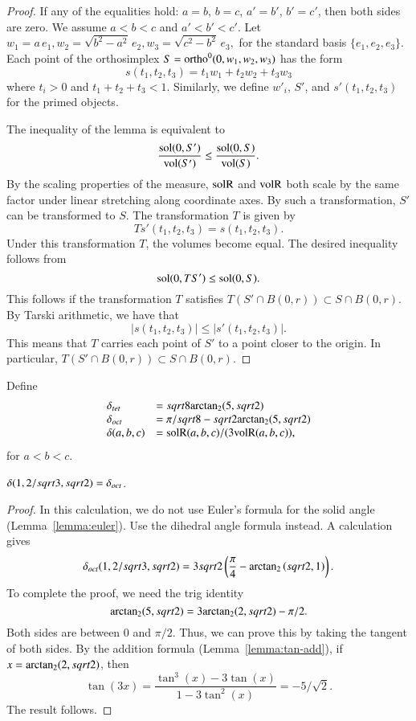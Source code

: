 \begin{proof} If any of the equalities hold: $a=b$, $b=c$, $a'=b'$,
$b'=c'$, then both sides are zero.  We assume $a<b<c$ and $a'<b'<c'$.
Let $w_1=a\,e_1,w_2=\sqrt{b^2-a^2}\, e_2,w_3=\sqrt{c^2-b^2}\, e_3,$
for the standard basis $\{e_1,e_2,e_3\}$.  Each point of the orthosimplex
$S = {\operatorname{ortho}}^0(0,w_1,w_2,w_3)$ has
the form
   $$s(t_1,t_2,t_3) = t_1 w_1 + t_2 w_2 + t_3 w_3$$
where $t_i>0$ and $t_1+t_2+t_3< 1$.  Similarly,
we define $w'_i$, $S'$, and $s'(t_1,t_2,t_3)$ for the primed objects.

The inequality of the lemma is equivalent to
  $$
  \frac{\operatorname{sol}(0,S')}{{\operatorname{vol}}(S')} \le \frac{\operatorname{sol}(0,S)}{{\operatorname{vol}}(S)}.
  $$
By the scaling properties of the measure, ${\operatorname{solR}}$ and ${\operatorname{volR}}$ both
scale by the same factor under linear stretching along coordinate axes.
By such a transformation, $S'$ can be transformed to $S$.  The
transformation $T$ is given by 
   $$
   T s'(t_1,t_2,t_3) = s(t_1,t_2,t_3).
   $$
Under this transformation $T$, the volumes become equal.
The desired inequality follows from
   $$
   \operatorname{sol}(0,T S') \le \operatorname{sol}(0,S).
   $$
This follows if the transformation $T$ satisfies
   $T(S'\cap B(0,r))\subset S\cap B(0,r)$.
By Tarski arithmetic, we have that 
   $$|s(t_1,t_2,t_3)|\le |s'(t_1,t_2,t_3)|.$$
This means that $T$ carries each point of $S'$ to a point closer to
the origin.  In particular,
  $T(S'\cap B(0,r))\subset S\cap B(0,r)$.
\end{proof}

\begin{definition}[$\dtet$, $\doct$]  Define 
  $$
  \begin{array}{lll}
  \delta_{tet} &= sqrt8 {\operatorname{arctan_2}}(5,sqrt2)\\
  \delta_{oct} &= \pi/sqrt8 - sqrt2 {\operatorname{arctan_2}}(5,sqrt2)\\
  \delta(a,b,c)&= {\operatorname{solR}}(a,b,c)/(3{\operatorname{volR}}(a,b,c)),
  \end{array}
  $$
for $a<b<c$.  
\end{definition}

\begin{lemma}
  $\delta(1,2/sqrt{3},sqrt2)=\delta_{oct}$.
\end{lemma}

\begin{proof}  In this calculation, we do not use Euler's formula
for the solid angle (Lemma~\ref{lemma:euler}).  
Use the dihedral angle formula instead.
A calculation gives
  $$
  \delta_{oct}(1,2/sqrt{3},sqrt2)=
  3 sqrt{2} \left(\frac{\pi }{4}-{\operatorname{arctan_2}}
   \left({sqrt{2}},{1}\right)\right).$$
To complete the proof, we need the trig identity
  $${\operatorname{arctan_2}}(5,sqrt2)  = 3{\operatorname{arctan_2}}(2,sqrt2)-\pi/2.$$
Both sides are between $0$ and $\pi/2$.  Thus, we can prove this
by taking the tangent of both sides. By the addition formula
(Lemma~\ref{lemma:tan-add}),
if $x={\operatorname{arctan_2}}(2,sqrt2)$, then
   $$\tan(3 x) = \frac{\tan^3(x) - 3\tan(x)}{1-3 \tan^2(x)} = -5/\sqrt2.$$
The result follows.
\end{proof}


